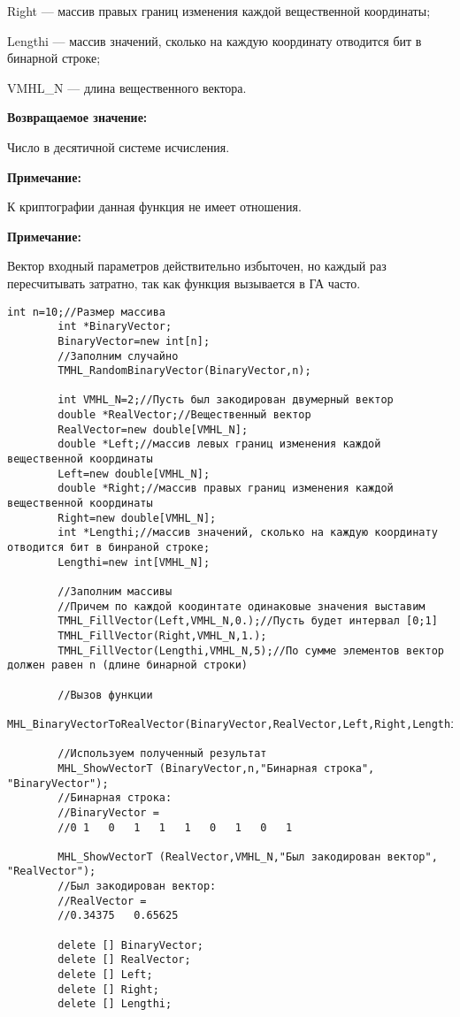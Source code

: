 \documentclass[a4paper,12pt]{article}
\begin{document}
Right --- массив правых границ изменения каждой вещественной координаты;
 
Lengthi --- массив значений, сколько на каждую координату отводится бит в бинарной строке;
 
VMHL\_N --- длина вещественного вектора.

\textbf{Возвращаемое значение:}
 
Число в десятичной системе исчисления.

\textbf{Примечание:}

 К криптографии данная функция не имеет отношения.
 
\textbf{Примечание:}

 Вектор входный параметров действительно избыточен, но каждый раз пересчитывать затратно, так как функция вызывается в ГА часто.


\begin{lstlisting}[label=code_use_MHL_BinaryVectorToRealVector,caption=Пример использования]
        int n=10;//Размер массива
        int *BinaryVector;
        BinaryVector=new int[n];
        //Заполним случайно
        TMHL_RandomBinaryVector(BinaryVector,n);

        int VMHL_N=2;//Пусть был закодирован двумерный вектор
        double *RealVector;//Вещественный вектор
        RealVector=new double[VMHL_N];
        double *Left;//массив левых границ изменения каждой вещественной координаты
        Left=new double[VMHL_N];
        double *Right;//массив правых границ изменения каждой вещественной координаты
        Right=new double[VMHL_N];
        int *Lengthi;//массив значений, сколько на каждую координату отводится бит в бинраной строке;
        Lengthi=new int[VMHL_N];

        //Заполним массивы
        //Причем по каждой коодинтате одинаковые значения выставим
        TMHL_FillVector(Left,VMHL_N,0.);//Пусть будет интервал [0;1]
        TMHL_FillVector(Right,VMHL_N,1.);
        TMHL_FillVector(Lengthi,VMHL_N,5);//По сумме элементов вектор должен равен n (длине бинарной строки)

        //Вызов функции
        MHL_BinaryVectorToRealVector(BinaryVector,RealVector,Left,Right,Lengthi,VMHL_N);

        //Используем полученный результат
        MHL_ShowVectorT (BinaryVector,n,"Бинарная строка", "BinaryVector");
        //Бинарная строка:
        //BinaryVector =	
        //0	1	0	1	1	1	0	1	0	1

        MHL_ShowVectorT (RealVector,VMHL_N,"Был закодирован вектор", "RealVector");
        //Был закодирован вектор:
        //RealVector =	
        //0.34375	0.65625

        delete [] BinaryVector;
        delete [] RealVector;
        delete [] Left;
        delete [] Right;
        delete [] Lengthi;
\end{lstlisting}
\end{document}
